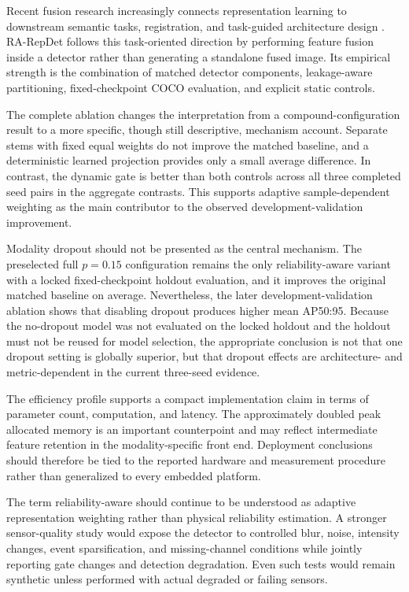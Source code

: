 Recent fusion research increasingly connects representation learning to downstream semantic tasks, registration, and task-guided architecture design \cite{Liu2024TIMFusion,Tang2023PSFusion,Xie2023SemanticsLeadAll}. RA-RepDet follows this task-oriented direction by performing feature fusion inside a detector rather than generating a standalone fused image. Its empirical strength is the combination of matched detector components, leakage-aware partitioning, fixed-checkpoint COCO evaluation, and explicit static controls.

The complete ablation changes the interpretation from a compound-configuration result to a more specific, though still descriptive, mechanism account. Separate stems with fixed equal weights do not improve the matched baseline, and a deterministic learned projection provides only a small average difference. In contrast, the dynamic gate is better than both controls across all three completed seed pairs in the aggregate contrasts. This supports adaptive sample-dependent weighting as the main contributor to the observed development-validation improvement.

Modality dropout should not be presented as the central mechanism. The preselected full $p=0.15$ configuration remains the only reliability-aware variant with a locked fixed-checkpoint holdout evaluation, and it improves the original matched baseline on average. Nevertheless, the later development-validation ablation shows that disabling dropout produces higher mean AP50:95. Because the no-dropout model was not evaluated on the locked holdout and the holdout must not be reused for model selection, the appropriate conclusion is not that one dropout setting is globally superior, but that dropout effects are architecture- and metric-dependent in the current three-seed evidence.

The efficiency profile supports a compact implementation claim in terms of parameter count, computation, and latency. The approximately doubled peak allocated memory is an important counterpoint and may reflect intermediate feature retention in the modality-specific front end. Deployment conclusions should therefore be tied to the reported hardware and measurement procedure rather than generalized to every embedded platform.

The term reliability-aware should continue to be understood as adaptive representation weighting rather than physical reliability estimation. A stronger sensor-quality study would expose the detector to controlled blur, noise, intensity changes, event sparsification, and missing-channel conditions while jointly reporting gate changes and detection degradation. Even such tests would remain synthetic unless performed with actual degraded or failing sensors.

